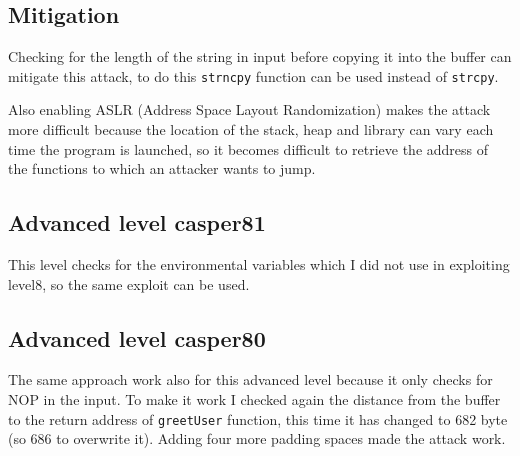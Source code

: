 \documentclass[a4paper,12pt]{article}
\begin{document}



\subsection{Mitigation}

Checking for the length of the string in input before copying it into the buffer can mitigate this attack, to do this \texttt{strncpy} function can be used instead of \texttt{strcpy}.

Also enabling ASLR (Address Space Layout Randomization) makes the attack more difficult because the location of the stack, heap and library can vary each time the program is launched, so it becomes difficult to retrieve the address of the functions to which an attacker wants to jump.

\subsection{Advanced level casper81}

This level checks for the environmental variables which I did not use in exploiting level8, so the same exploit can be used.

\subsection{Advanced level casper80}

The same approach work also for this advanced level because it only checks for NOP in the input. To make it work I checked again the distance from the buffer to the return address of \texttt{greetUser} function, this time it has changed to 682 byte (so 686 to overwrite it). Adding four more padding spaces made the attack work.
\end{document}
